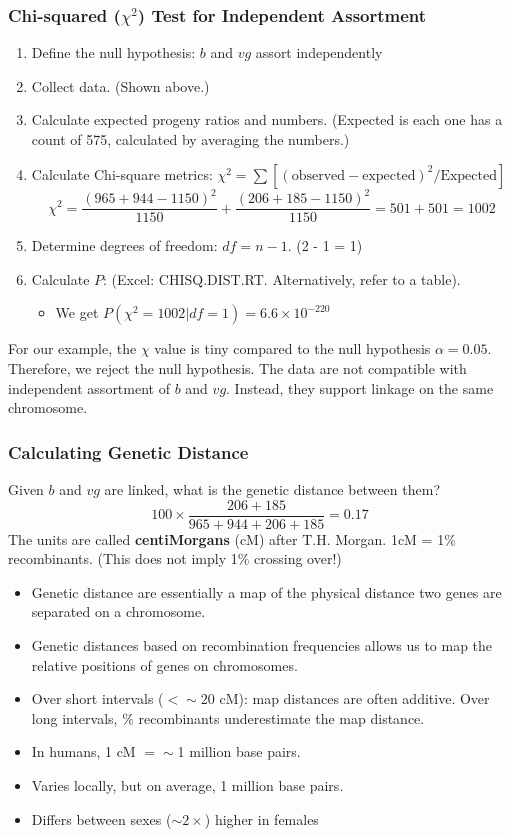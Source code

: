\documentclass[10pt]{article}
\begin{document}
\subsubsection*{Chi-squared ($\chi^2$) Test for Independent Assortment}
\begin{enumerate}
	\item Define the null hypothesis: $b$ and $vg$ assort independently
	\item Collect data.  (Shown above.)
    \item Calculate expected progeny ratios and numbers. (Expected is each one has a count of 575, calculated by averaging the numbers.)
    \item Calculate Chi-square metrics: $\chi^2 = \sum [(\text{observed} - \text{expected})^2 / \text{Expected}]$
    \[\chi^2 = \frac{(965 + 944 - 1150)^2}{1150} + \frac{(206 + 185 - 1150)^2}{1150} = 501 + 501 = 1002\]
    \item Determine degrees of freedom: $df = n - 1$.  (2 - 1 = 1)
    \item Calculate $P$: (Excel: CHISQ.DIST.RT.  Alternatively, refer to a table).
    \begin{itemize}
	    \item We get $P(\chi^2 = 1002 | df = 1) = 6.6\times 10^{-220}$
    \end{itemize}
\end{enumerate}
For our example, the $\chi$ value is tiny compared to the null hypothesis $\alpha = 0.05$.  Therefore, we reject the null hypothesis.  The data are not compatible with independent assortment of $b$ and $vg$.  Instead, they support linkage on the same chromosome.

\subsubsection*{Calculating Genetic Distance}
Given $b$ and $vg$ are linked, what is the genetic distance between them?
\[100 \times \frac{206 + 185}{965 + 944 + 206 + 185} = 0.17\]
The units are called \textbf{centiMorgans} (cM) after T.H. Morgan.  1cM = 1\% recombinants.  (This does not imply 1\% crossing over!)
\begin{itemize}
	\item Genetic distance are essentially a map of the physical distance two genes are separated on a chromosome.
	\item Genetic distances based on recombination frequencies allows us to map the relative positions of genes on chromosomes.
	\item Over short intervals ($< \sim 20$ cM): map distances are often additive.  Over long intervals, $\%$ recombinants underestimate the map distance.
	\item In humans, 1 cM $= \sim$1 million base pairs.
	\item Varies locally, but on average, 1 million base pairs.
	\item Differs between sexes ($\sim 2\times$) higher in females
\end{itemize}
\end{document}
